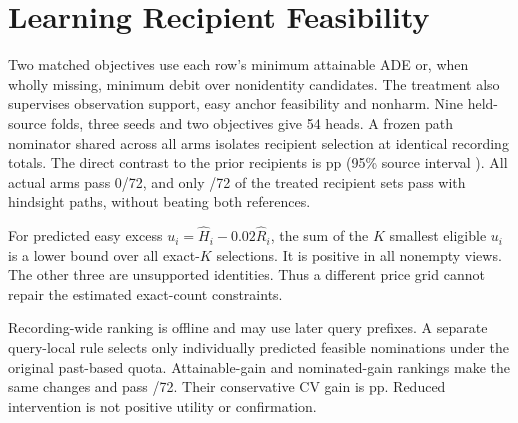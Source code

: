 \section{Learning Recipient Feasibility}
Two matched objectives use each row's minimum attainable ADE or,
when wholly missing, minimum debit over nonidentity candidates.
The treatment also supervises observation support, easy anchor
feasibility and nonharm. Nine held-source folds, three seeds and
two objectives give 54 heads. A frozen path nominator shared across
all arms isolates recipient selection at identical recording totals.
The direct contrast to the prior recipients is \RecipientFitEffect{}
pp (95\% source interval \RecipientFitCI). All actual arms pass
0/72, and only \RecipientFitRiskOnly/72 of the treated recipient
sets pass with hindsight paths, without beating both references.

For predicted easy excess $u_i=\widehat H_i-0.02\widehat R_i$,
the sum of the $K$ smallest eligible $u_i$ is a lower bound over
all exact-$K$ selections. It is positive in all
\RecipientFitInfeasible{} nonempty views. The other three are
unsupported identities. Thus a different price grid cannot
repair the estimated exact-count constraints.

Recording-wide ranking is offline and may use later query
prefixes. A separate query-local rule selects only individually
predicted feasible nominations under the original past-based
quota. Attainable-gain and nominated-gain rankings make the same
\RecipientFitMoves{} changes and pass \RecipientFitLocalPass/72.
Their conservative CV gain is \RecipientFitLocalGain{} pp.
Reduced intervention is not positive utility or confirmation.
